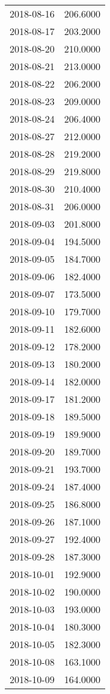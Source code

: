 \begin{tabular}{lr}
2018-08-16 &    206.6000 \\
2018-08-17 &    203.2000 \\
2018-08-20 &    210.0000 \\
2018-08-21 &    213.0000 \\
2018-08-22 &    206.2000 \\
2018-08-23 &    209.0000 \\
2018-08-24 &    206.4000 \\
2018-08-27 &    212.0000 \\
2018-08-28 &    219.2000 \\
2018-08-29 &    219.8000 \\
2018-08-30 &    210.4000 \\
2018-08-31 &    206.0000 \\
2018-09-03 &    201.8000 \\
2018-09-04 &    194.5000 \\
2018-09-05 &    184.7000 \\
2018-09-06 &    182.4000 \\
2018-09-07 &    173.5000 \\
2018-09-10 &    179.7000 \\
2018-09-11 &    182.6000 \\
2018-09-12 &    178.2000 \\
2018-09-13 &    180.2000 \\
2018-09-14 &    182.0000 \\
2018-09-17 &    181.2000 \\
2018-09-18 &    189.5000 \\
2018-09-19 &    189.9000 \\
2018-09-20 &    189.7000 \\
2018-09-21 &    193.7000 \\
2018-09-24 &    187.4000 \\
2018-09-25 &    186.8000 \\
2018-09-26 &    187.1000 \\
2018-09-27 &    192.4000 \\
2018-09-28 &    187.3000 \\
2018-10-01 &    192.9000 \\
2018-10-02 &    190.0000 \\
2018-10-03 &    193.0000 \\
2018-10-04 &    180.3000 \\
2018-10-05 &    182.3000 \\
2018-10-08 &    163.1000 \\
2018-10-09 &    164.0000 \\

\end{tabular}
